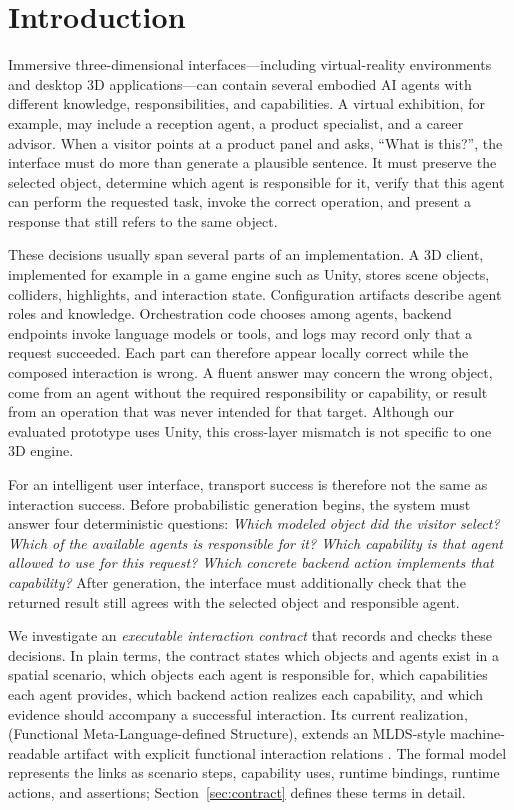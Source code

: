 \section{Introduction}
\label{sec:introduction}

Immersive three-dimensional interfaces---including virtual-reality environments
and desktop 3D applications---can contain several embodied AI agents with
different knowledge, responsibilities, and capabilities.  A virtual exhibition,
for example, may include a reception agent, a product specialist, and a career
advisor.  When a visitor points at a product panel and asks, ``What is this?'',
the interface must do more than generate a plausible sentence.  It must preserve
the selected object, determine which agent is responsible for it, verify that
this agent can perform the requested task, invoke the correct operation, and
present a response that still refers to the same object.

These decisions usually span several parts of an implementation.  A 3D client,
implemented for example in a game engine such as Unity, stores scene objects,
colliders, highlights, and interaction state.  Configuration artifacts describe
agent roles and knowledge.  Orchestration code chooses among agents, backend
endpoints invoke language models or tools, and logs may record only that a
request succeeded.  Each part can therefore appear locally correct while the
composed interaction is wrong.  A fluent answer may concern the wrong object,
come from an agent without the required responsibility or capability, or result
from an operation that was never intended for that target.  Although our
evaluated prototype uses Unity, this cross-layer mismatch is not specific to one
3D engine.

For an intelligent user interface, transport success is therefore not the same
as interaction success.  Before probabilistic generation begins, the system
must answer four deterministic questions: \emph{Which modeled object did the
visitor select?  Which of the available agents is responsible for it?  Which
capability is that agent allowed to use for this request?  Which concrete
backend action implements that capability?}  After generation, the interface
must additionally check that the returned result still agrees with the selected
object and responsible agent.

We investigate an \emph{executable interaction contract} that records and
checks these decisions.  In plain terms, the contract states which objects and
agents exist in a spatial scenario, which objects each agent is responsible
for, which capabilities each agent provides, which backend action realizes each
capability, and which evidence should accompany a successful interaction.  Its
current realization, \systemname{} (Functional Meta-Language-defined
Structure), extends an MLDS-style machine-readable artifact with explicit
functional interaction relations \cite{fischer2025machinereadable}.  The formal
model represents the links as scenario steps, capability uses, runtime bindings,
runtime actions, and assertions; Section~\ref{sec:contract} defines these terms
in detail.

